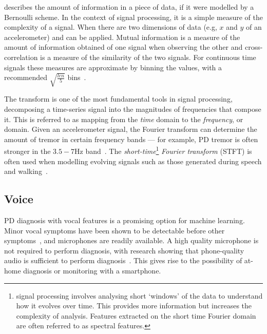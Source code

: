 \documentclass[12pt, twoside]{book}
\renewcommand\emph[1]{\textit{\color{USred}{#1}}}
\begin{document}
\emph{Entropy} describes the amount of information in a piece of data, if it were modelled by a Bernoulli scheme. In the context of signal processing, it is a simple measure of the complexity of a signal. When there are two dimensions of data (e.g, $x$ and $y$ of an accelerometer) \emph{mutual information} and \emph{cross correlation} can be applied. Mutual information is a measure of the amount of information obtained of one signal when observing the other and cross-correlation is a measure of the similarity of the two signals. For continuous time signals these measures are approximate by binning the values, with a recommended $\sqrt{\frac{len}{5}}$ bins~\cite{entropymeasures}.

The \emph{Fourier} transform is one of the most fundamental tools in signal processing, decomposing a time-series signal into the magnitudes of frequencies that compose it. This is referred to as mapping from the \textit{time} domain to the \textit{frequency}, or \emph{spectral} domain. Given an accelerometer signal, the Fourier transform can determine the amount of tremor in certain frequency bands --- for example, PD tremor is often stronger in the $3.5-7$Hz band~\cite{duval2004detection}. The \textit{short-time}\footnote{\emph{Short-time} signal processing involves analysing short `windows' of the data to understand how it evolves over time. This provides more information but increases the complexity of analysis. Features extracted on the short time Fourier domain are often referred to as spectral features.} \textit{Fourier transform} (STFT) is often used when modelling evolving signals such as those generated during speech and walking~\cite{microsoftspeech,deepfft}. 




\subsection{Voice}
PD diagnosis with vocal features is a promising option for machine learning. Minor vocal symptoms have been shown to be detectable before other symptoms~\cite{earlyvowel}, and  microphones are readily available. A high quality microphone is not required to perform diagnosis, with research showing that phone-quality audio is sufficient to perform diagnosis~\cite{splittledysphonia2009}. This gives rise to the possibility of at-home diagnosis or monitoring with a smartphone. %
\end{document}
